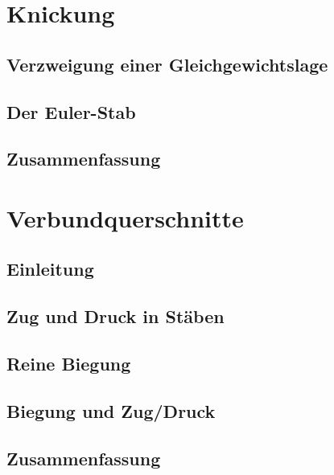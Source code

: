 \documentclass[11pt]{article}
\newcommand{\1}{ {\mathds{1}} }
\begin{document}
		\section{Knickung}
		\subsection{Verzweigung einer Gleichgewichtslage}
		\subsection{Der Euler-Stab}
		\subsection{Zusammenfassung}
	
		\section{Verbundquerschnitte}
		\subsection{Einleitung}
		\subsection{Zug und Druck in Stäben}
		\subsection{Reine Biegung}
		\subsection{Biegung und Zug/Druck}
		\subsection{Zusammenfassung}
\end{document}
